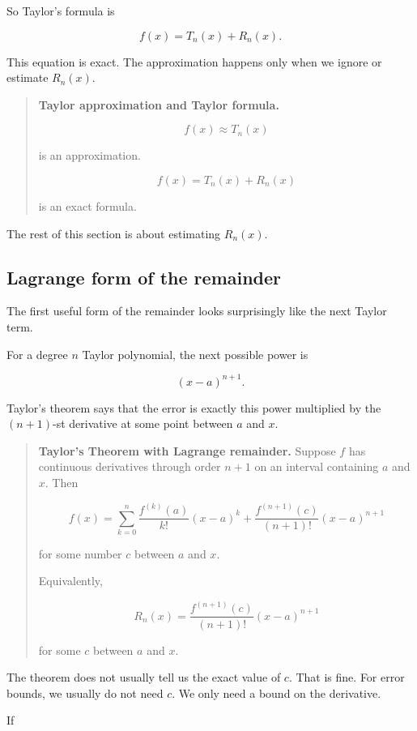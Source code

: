 So Taylor's formula is

\[
\boxed{
f(x)=T_n(x)+R_n(x).
}
\]

This equation is exact.  The approximation happens only when we ignore or estimate
\(R_n(x)\).

\begin{quote}
\textbf{Taylor approximation and Taylor formula.}

\[
f(x)\approx T_n(x)
\]

is an approximation.

\[
f(x)=T_n(x)+R_n(x)
\]

is an exact formula.
\end{quote}

The rest of this section is about estimating \(R_n(x)\).

\subsection{Lagrange form of the remainder}
\label{subsec:lagrange-remainder}

The first useful form of the remainder looks surprisingly like the next Taylor term.

For a degree \(n\) Taylor polynomial, the next possible power is

\[
(x-a)^{n+1}.
\]

Taylor's theorem says that the error is exactly this power multiplied by the
\((n+1)\)-st derivative at some point between \(a\) and \(x\).

\begin{quote}
\textbf{Taylor's Theorem with Lagrange remainder.}
Suppose \(f\) has continuous derivatives through order \(n+1\) on an interval containing
\(a\) and \(x\).  Then

\[
\boxed{
f(x)=
\sum_{k=0}^{n}
\frac{f^{(k)}(a)}{k!}(x-a)^k
+
\frac{f^{(n+1)}(c)}{(n+1)!}(x-a)^{n+1}
}
\]

for some number \(c\) between \(a\) and \(x\).

Equivalently,

\[
\boxed{
R_n(x)=
\frac{f^{(n+1)}(c)}{(n+1)!}(x-a)^{n+1}
}
\]

for some \(c\) between \(a\) and \(x\).
\end{quote}

The theorem does not usually tell us the exact value of \(c\).  That is fine.  For error
bounds, we usually do not need \(c\).  We only need a bound on the derivative.

If

